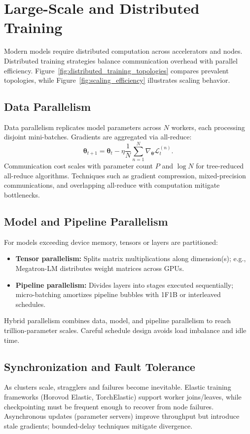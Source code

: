 \documentclass{article}
\begin{document}
\section{Large-Scale and Distributed Training}
Modern models require distributed computation across accelerators and nodes. Distributed training strategies balance communication overhead with parallel efficiency. Figure~\ref{fig:distributed_training_topologies} compares prevalent topologies, while Figure~\ref{fig:scaling_efficiency} illustrates scaling behavior.

\subsection{Data Parallelism}
Data parallelism replicates model parameters across $N$ workers, each processing disjoint mini-batches. Gradients are aggregated via all-reduce:
\begin{equation}
  \boldsymbol{\theta}_{t+1} = \boldsymbol{\theta}_t - \eta \frac{1}{N} \sum_{n=1}^{N} \nabla_{\boldsymbol{\theta}} \mathcal{L}_t^{(n)}.
\end{equation}
Communication cost scales with parameter count $P$ and $\log N$ for tree-reduced all-reduce algorithms. Techniques such as gradient compression, mixed-precision communications, and overlapping all-reduce with computation mitigate bottlenecks.

\subsection{Model and Pipeline Parallelism}
For models exceeding device memory, tensors or layers are partitioned:
\begin{itemize}
  \item \textbf{Tensor parallelism:} Splits matrix multiplications along dimension(s); e.g., Megatron-LM distributes weight matrices across GPUs.
  \item \textbf{Pipeline parallelism:} Divides layers into stages executed sequentially; micro-batching amortizes pipeline bubbles with 1F1B or interleaved schedules.
\end{itemize}
Hybrid parallelism combines data, model, and pipeline parallelism to reach trillion-parameter scales. Careful schedule design avoids load imbalance and idle time.

\subsection{Synchronization and Fault Tolerance}
As clusters scale, stragglers and failures become inevitable. Elastic training frameworks (Horovod Elastic, TorchElastic) support worker joins/leaves, while checkpointing must be frequent enough to recover from node failures. Asynchronous updates (parameter servers) improve throughput but introduce stale gradients; bounded-delay techniques mitigate divergence.
\end{document}
